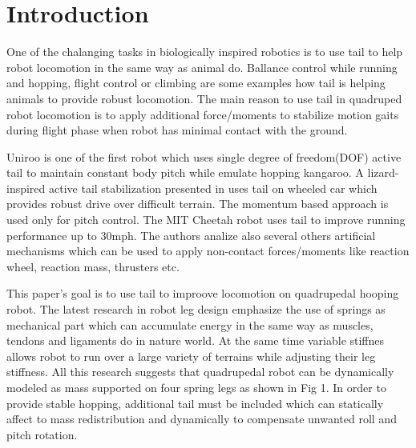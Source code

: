 \section{Introduction}\label{sec:introduction}

One of the chalanging tasks in biologically inspired robotics is to use tail to help robot locomotion in the same way as animal do. Ballance control while running and hopping, flight control or climbing are some examples how tail is helping animals to provide robust locomotion. The main reason to use tail in quadruped robot locomotion is to apply additional force/moments to stabilize motion gaits during flight phase when robot has minimal contact with the ground. 

Uniroo \cite{zeglin1991uniroo} is one of the first robot which uses single degree of freedom(DOF) active tail to maintain constant body pitch while emulate hopping kangaroo. A lizard-inspired active tail stabilization presented in \cite{conf/iros/Chang-SiuLTF11} uses tail on wheeled car which provides robust drive over difficult terrain. The momentum based approach is used only for pitch control. The MIT Cheetah robot \cite{DBLP:conf/iros/BriggsLHK12} uses tail to improve running performance up to 30mph. The authors analize also several others artificial mechanisms which can be used to apply non-contact forces/moments like reaction wheel, reaction mass, thrusters etc. 

This paper's goal is to use tail to improove locomotion on quadrupedal hooping robot. The latest research in robot leg design emphasize the use of springs as mechanical part which can accumulate energy in the same way as muscles, tendons and ligaments do in nature world\cite{Zeglin_1999_3268}\cite{Geyer06compliantleg}\cite{Hutter}\cite{RunningSpringer}. At the same time variable stiffnes allows robot to run over a large variety of terrains while adjusting their leg stiffness\cite{Galloway}\cite{Jun:2009:DSV:1703775.1704089}\cite{Hurst_2004_4785}. All this research suggests that quadrupedal robot can be dynamically modeled as mass supported on four spring legs as shown in Fig 1. In order to provide stable hopping, additional tail must be included which can statically affect to mass redistribution and dynamically to compensate unwanted roll and pitch rotation. 


